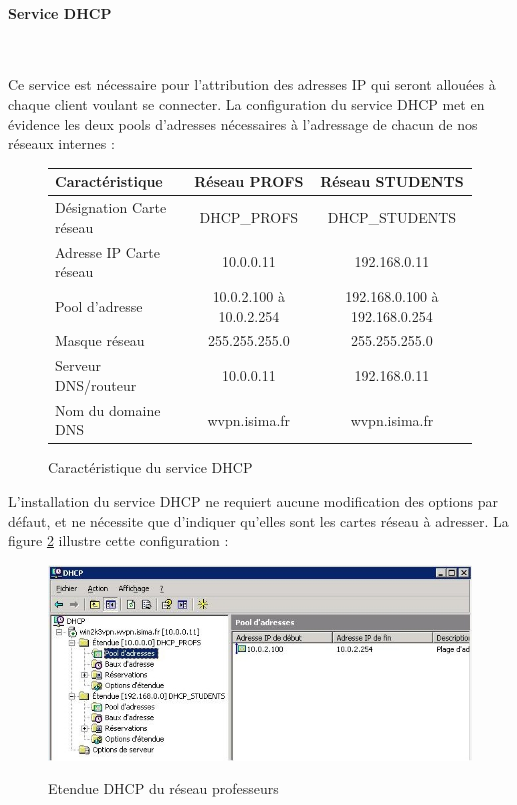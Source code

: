 \paragraph{Service DHCP}
~

Ce service est nécessaire pour l'attribution des adresses IP qui seront allouées à chaque client voulant se connecter. La configuration du service DHCP met en évidence les deux pools d'adresses nécessaires à l'adressage de chacun de nos réseaux internes :

\begin{figure}[H]
	\begin{center}
		\begin{tabular}{l|c|c}
			Caractéristique & Réseau PROFS & Réseau STUDENTS \\
			\hline
			Désignation Carte réseau & DHCP\_PROFS & DHCP\_STUDENTS \\
			Adresse IP Carte réseau & 10.0.0.11 & 192.168.0.11 \\
			Pool d'adresse & 10.0.2.100 à 10.0.2.254 & 192.168.0.100 à 192.168.0.254 \\
			Masque réseau & 255.255.255.0 & 255.255.255.0 \\
			Serveur DNS/routeur & 10.0.0.11 & 192.168.0.11 \\
			Nom du domaine DNS & wvpn.isima.fr & wvpn.isima.fr \\
		\end{tabular}
	\end{center}
	\caption{Caractéristique du service DHCP}
	\label{service_DHCP}
\end{figure}

L'installation du service DHCP ne requiert aucune modification des options par défaut, et ne nécessite que d'indiquer qu'elles sont les cartes réseau à adresser. La figure \ref{Screen_client_dhcp} illustre cette configuration :


\begin{figure}[H]
	\begin{center}
	\includegraphics[width=\textwidth]{partie_2/screen_windows/dhcp.JPG}\\
	\end{center}
	\caption{Etendue DHCP du réseau professeurs}
	\label{Screen_client_dhcp}
\end{figure}


